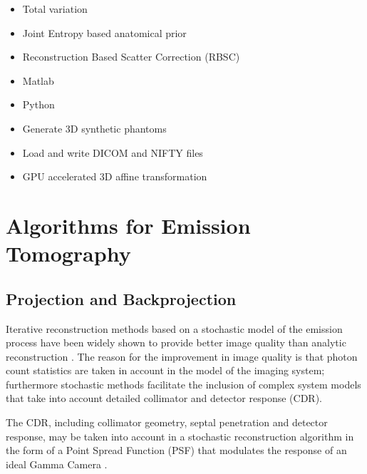 \documentclass[12pt,a4paper]{report}
\begin{document}
\begin{itemize}
  \item Total variation
  \item Joint Entropy based anatomical prior
\end{itemize}

\begin{itemize}
  \item Reconstruction Based Scatter Correction (RBSC)
\end{itemize}

\begin{itemize}
  \item Matlab
  \item Python
\end{itemize}

\begin{itemize}
  \item Generate 3D synthetic phantoms
  \item Load and write DICOM and NIFTY files
  \item GPU accelerated 3D affine transformation
\end{itemize}


\section{Algorithms for Emission Tomography}
\subsection{Projection and Backprojection}
Iterative reconstruction methods based on a stochastic model of the emission process \cite{shepp_1982,qi_2006,borman_2004} 
have been widely shown to provide better image quality than analytic reconstruction \cite{johnson_1997,frese_2003}. 
The reason for the improvement in image quality is that photon count statistics are taken in account in the model of the 
imaging system; furthermore stochastic methods facilitate the inclusion of complex system models that take into account 
detailed collimator and detector response (CDR). 

\noindent The CDR, including collimator geometry, septal penetration and detector response, may be taken
into account in a stochastic reconstruction algorithm in the form of a Point
Spread Function (PSF) that modulates the response of an
ideal Gamma Camera \cite{zeng_1992}\cite{rahmim_2008}.
\end{document}

